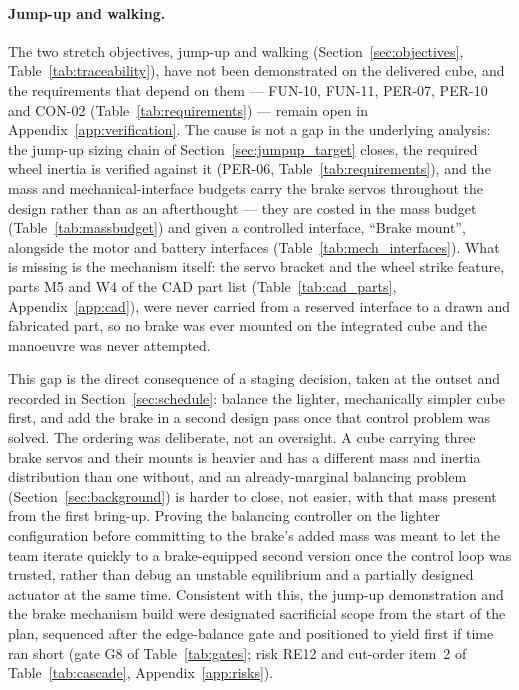 \paragraph{Jump-up and walking.} The two stretch objectives, jump-up and walking (Section~\ref{sec:objectives}, Table~\ref{tab:traceability}), have not been demonstrated on the delivered cube, and the requirements that depend on them --- FUN-10, FUN-11, PER-07, PER-10 and CON-02 (Table~\ref{tab:requirements}) --- remain open in Appendix~\ref{app:verification}. The cause is not a gap in the underlying analysis: the jump-up sizing chain of Section~\ref{sec:jumpup_target} closes, the required wheel inertia is verified against it (PER-06, Table~\ref{tab:requirements}), and the mass and mechanical-interface budgets carry the brake servos throughout the design rather than as an afterthought --- they are costed in the mass budget (Table~\ref{tab:massbudget}) and given a controlled interface, ``Brake mount'', alongside the motor and battery interfaces (Table~\ref{tab:mech_interfaces}). What is missing is the mechanism itself: the servo bracket and the wheel strike feature, parts M5 and W4 of the CAD part list (Table~\ref{tab:cad_parts}, Appendix~\ref{app:cad}), were never carried from a reserved interface to a drawn and fabricated part, so no brake was ever mounted on the integrated cube and the manoeuvre was never attempted.

This gap is the direct consequence of a staging decision, taken at the outset and recorded in Section~\ref{sec:schedule}: balance the lighter, mechanically simpler cube first, and add the brake in a second design pass once that control problem was solved. The ordering was deliberate, not an oversight. A cube carrying three brake servos and their mounts is heavier and has a different mass and inertia distribution than one without, and an already-marginal balancing problem (Section~\ref{sec:background}) is harder to close, not easier, with that mass present from the first bring-up. Proving the balancing controller on the lighter configuration before committing to the brake's added mass was meant to let the team iterate quickly to a brake-equipped second version once the control loop was trusted, rather than debug an unstable equilibrium and a partially designed actuator at the same time. Consistent with this, the jump-up demonstration and the brake mechanism build were designated sacrificial scope from the start of the plan, sequenced after the edge-balance gate and positioned to yield first if time ran short (gate G8 of Table~\ref{tab:gates}; risk RE12 and cut-order item~2 of Table~\ref{tab:cascade}, Appendix~\ref{app:risks}).


